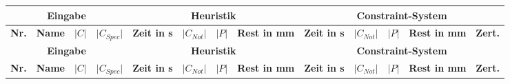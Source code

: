 \begin{landscape}
        \begin{longtable}{|c|l|c|c||c|c|c|c||c|c|c|c|c|}
                \hline
                \multicolumn{4}{|c||}{\textbf{Eingabe}} & \multicolumn{4}{c||}{\textbf{Heuristik}} & \multicolumn{5}{c|}{\textbf{Constraint-System}} \\
                \hline
                \textbf{Nr.} & \textbf{Name} & \textbf{$\lvert C \rvert$} & \textbf{$\lvert C_{Spec} \rvert$} & \textbf{Zeit in s} & \textbf{$\lvert C_{Not} \rvert$} & \textbf{$\lvert P \rvert$} & \textbf{Rest in mm} & \textbf{Zeit in s} & \textbf{$\lvert C_{Not} \rvert$} & \textbf{$\lvert P \rvert$} & \textbf{Rest in mm} & \textbf{Zert.} \\
                \hline
                \endfirsthead

                \hline
                \multicolumn{4}{|c||}{\textbf{Eingabe}} & \multicolumn{4}{c||}{\textbf{Heuristik}} & \multicolumn{5}{c|}{\textbf{Constraint-System}} \\
                \hline
                \textbf{Nr.} & \textbf{Name} & \textbf{$\lvert C \rvert$} & \textbf{$\lvert C_{Spec} \rvert$} & \textbf{Zeit in s} & \textbf{$\lvert C_{Not} \rvert$} & \textbf{$\lvert P \rvert$} & \textbf{Rest in mm} & \textbf{Zeit in s} & \textbf{$\lvert C_{Not} \rvert$} & \textbf{$\lvert P \rvert$} & \textbf{Rest in mm} & \textbf{Zert.} \\
                \hline
                \endhead


\end{longtable}
\end{landscape}

